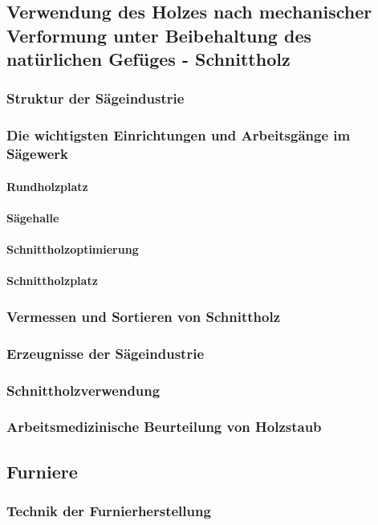 \documentclass{article}
\begin{document}
\subsection{Verwendung des Holzes nach mechanischer Verformung unter Beibehaltung des natürlichen Gefüges - Schnittholz}
\subsubsection{Struktur der Sägeindustrie}
\subsubsection{Die wichtigsten Einrichtungen und Arbeitsgänge im Sägewerk}
\paragraph{Rundholzplatz}
\paragraph{Sägehalle}
\paragraph{Schnittholzoptimierung}
\paragraph{Schnittholzplatz}
\subsubsection{Vermessen und Sortieren von Schnittholz}
\subsubsection{Erzeugnisse der Sägeindustrie}
\subsubsection{Schnittholzverwendung}
\subsubsection{Arbeitsmedizinische Beurteilung von Holzstaub}
\subsection{Furniere}
\subsubsection{Technik der Furnierherstellung}
\end{document}

